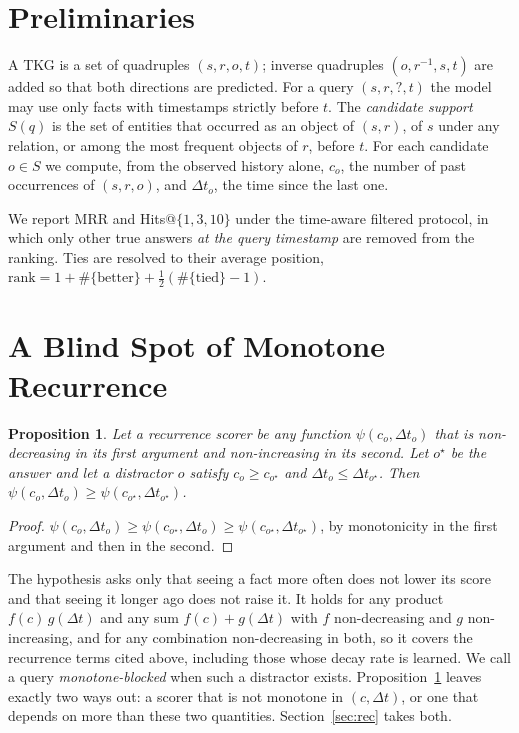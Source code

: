 \documentclass[conference]{IEEEtran}
\newtheorem{proposition}{Proposition}
\begin{document}
\section{Preliminaries}
\label{sec:prelim}

A TKG is a set of quadruples $(s,r,o,t)$; inverse quadruples
$(o,r^{-1},s,t)$ are added so that both directions are predicted. For a query
$(s,r,?,t)$ the model may use only facts with timestamps strictly before $t$.
The \emph{candidate support} $S(q)$ is the set of entities that occurred as an
object of $(s,r)$, of $s$ under any relation, or among the most frequent
objects of $r$, before $t$. For each candidate $o\in S$ we compute, from the
observed history alone, $c_o$, the number of past occurrences of $(s,r,o)$, and
$\Delta t_o$, the time since the last one.

We report MRR and Hits@$\{1,3,10\}$ under the time-aware filtered protocol, in
which only other true answers \emph{at the query timestamp} are removed from
the ranking. Ties are resolved to their average position,
$\mathrm{rank} = 1 + \#\{\text{better}\} + \tfrac12(\#\{\text{tied}\}-1)$.

\section{A Blind Spot of Monotone Recurrence}
\label{sec:blocked}

\begin{proposition}
\label{prop:blocked}
Let a recurrence scorer be any function $\psi(c_o, \Delta t_o)$ that is
non-decreasing in its first argument and non-increasing in its second. Let
$o^\star$ be the answer and let a distractor $o$ satisfy $c_o \ge c_{o^\star}$
and $\Delta t_o \le \Delta t_{o^\star}$. Then
$\psi(c_o, \Delta t_o) \ge \psi(c_{o^\star}, \Delta t_{o^\star})$.
\end{proposition}

\begin{proof}
$\psi(c_o, \Delta t_o) \ge \psi(c_{o^\star}, \Delta t_o) \ge
\psi(c_{o^\star}, \Delta t_{o^\star})$, by monotonicity in the first argument
and then in the second.
\end{proof}

The hypothesis asks only that seeing a fact more often does not lower its
score and that seeing it longer ago does not raise it. It holds for any product
$f(c)\,g(\Delta t)$ and any sum $f(c)+g(\Delta t)$ with $f$ non-decreasing and
$g$ non-increasing, and for any combination non-decreasing in both, so it
covers the recurrence terms cited above, including those whose decay rate is
learned. We call a query \emph{monotone-blocked} when such a distractor exists.
Proposition~\ref{prop:blocked} leaves exactly two ways out: a scorer that is not
monotone in $(c,\Delta t)$, or one that depends on more than these two
quantities. Section~\ref{sec:rec} takes both.
\end{document}

